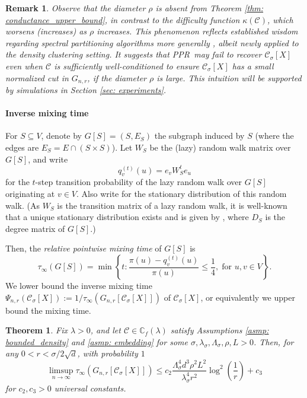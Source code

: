 \documentclass{article}
\newcommand{\set}[1]{\left\{#1\right\}}
\newcommand{\vol}{\mathrm{vol}}
\newcommand{\1}{\mathbf{1}}
\newcommand{\Xbf}{X}             %
\newcommand{\Wbf}{W}
\newcommand{\Dbf}{D}
\newcommand{\Cbb}{\mathbb{C}}
\newcommand{\Cset}{\mathcal{C}}
\newcommand{\Csig}{\Cset_{\sigma}}
\newcommand{\pprspace}{{\sc PPR~}}
\theoremstyle{aldenthm}
\newtheorem{theorem}{Theorem}
\theoremstyle{aldenrmrk}
\newtheorem{remark}{Remark}
\begin{document}
\begin{remark}
	Observe that the diameter $\rho$ is absent from Theorem \ref{thm: conductance_upper_bound}, in contrast to the difficulty function $\kappa(\Cset)$, which worsens (increases) as $\rho$ increases. This phenomenon reflects established wisdom regarding spectral partitioning algorithms more generally \cite{guattery1995, hein2010}, albeit newly applied to the density clustering setting. It suggests that \pprspace may fail to recover $\Csig[\Xbf]$ even when $\Cset$ is sufficiently well-conditioned to ensure $\Csig[\Xbf]$ has a small normalized cut in $G_{n,r}$, if the diameter $\rho$ is large. This intuition will be supported by simulations in Section \ref{sec: experiments}.
\end{remark}

\paragraph{Inverse mixing time}
For $S \subseteq V$, denote by $G[S] = (S, E_S)$ the subgraph induced by 
$S$ (where the edges are $E_S = E \cap (S \times S)$). Let $\Wbf_S$ be the (lazy) random walk matrix over $G[S]$, and write 
$$
q_{v}^{(t)}(u) = e_v\Wbf_S^t e_u
$$
for the $t$-step transition probability of the lazy random walk over $G[S]$
originating at $v \in V$. Also write 
for the stationary distribution of this random walk.  (As
$\Wbf_S$ is the transition matrix of a lazy random walk, it is well-known that a unique stationary distribution exists and is given by
\smash{$\pi(u) = (\Dbf_S)_{uu}/\vol(S; G[S])$}, where $\Dbf_S$ is the degree matrix of $G[S]$.)

Then, the \emph{relative pointwise mixing time} of $G[S]$ is 
\begin{equation}
\label{eqn: mixing_time}
\tau_{\infty}(G[S]) = \min\set{ t: \frac{\pi(u) - q_{v}^{(t)}(u)
	}{\pi(u)} \leq \frac{1}{4}, 
	\; \text{for $u,v \in V$}}. 
\end{equation}
We lower bound the inverse mixing time $\Psi_{n,r}(\Csig[\Xbf]) := 1/\tau_{\infty}(G_{n,r}[\Csig[\Xbf]])$ of $\Csig[\Xbf]$, or equivalently we upper bound the mixing time.

\begin{theorem}
	\label{thm: mixing_time_upper_bound}
	Fix $\lambda > 0$, and let $\Cset \in \Cbb_f(\lambda)$ satisfy Assumptions \ref{asmp: bounded_density} and \ref{asmp: embedding} for some $\sigma, \lambda_{\sigma}, \Lambda_{\sigma}, \rho, L > 0$. Then, for any $0 < r < \sigma/2\sqrt{d}$, with probability $1$
	\begin{equation}
	\label{eqn: mixing_time_upper_bound}
	\limsup_{n \to \infty}\tau_{\infty}(G_{n,r}[\Csig[\Xbf]]) \leq c_2 \frac{\Lambda_{\sigma}^4 d^3 \rho^2 L^2}{\lambda_{\sigma}^4 r^2} \log^2\left(\frac{1}{r}\right) + c_3
	\end{equation}
	for $c_2,c_3 > 0$ universal constants. 
\end{theorem}
\end{document}
